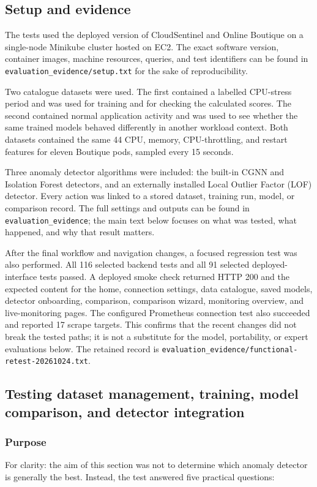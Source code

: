 \subsection{Setup and evidence}

The tests used the deployed version of CloudSentinel and Online Boutique on a single-node Minikube cluster hosted on EC2. The exact software version, container images, machine resources, queries, and test identifiers can be found in \texttt{evaluation\_evidence/setup.txt} for the sake of reproducibility.

Two catalogue datasets were used. The first contained a labelled CPU-stress period and was used for training and for checking the calculated scores. The second contained normal application activity and was used to see whether the same trained models behaved differently in another workload context. Both datasets contained the same 44 CPU, memory, CPU-throttling, and restart features for eleven Boutique pods, sampled every 15 seconds.

Three anomaly detector algorithms were included: the built-in CGNN and Isolation Forest detectors, and an externally installed Local Outlier Factor (LOF) detector. Every action was linked to a stored dataset, training run, model, or comparison record. The full settings and outputs can be found in \texttt{evaluation\_evidence}; the main text below focuses on what was tested, what happened, and why that result matters.

After the final workflow and navigation changes, a focused regression test was also performed. All 116 selected backend tests and all 91 selected deployed-interface tests passed. A deployed smoke check returned HTTP 200 and the expected content for the home, connection settings, data catalogue, saved models, detector onboarding, comparison, comparison wizard, monitoring overview, and live-monitoring pages. The configured Prometheus connection test also succeeded and reported 17 scrape targets. This confirms that the recent changes did not break the tested paths; it is not a substitute for the model, portability, or expert evaluations below. The retained record is \texttt{evaluation\_evidence/functional-retest-20261024.txt}.

\subsection{Testing dataset management, training, model comparison, and detector integration}

\subsubsection{Purpose}
For clarity: the aim of this section was not to determine which anomaly detector is generally the best. Instead, the test answered five practical questions:

